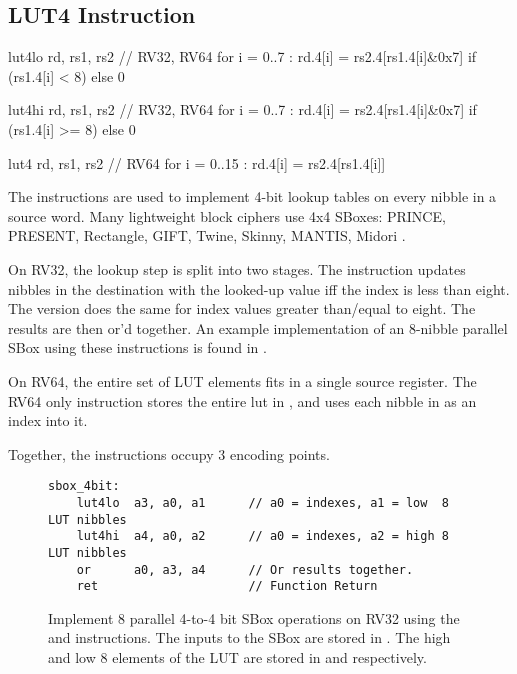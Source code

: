 

\subsection{LUT4 Instruction}

\begin{cryptoisa}
lut4lo  rd, rs1, rs2    // RV32, RV64
    for i = 0..7 : rd.4[i] = rs2.4[rs1.4[i]&0x7] if (rs1.4[i] <  8) else 0

lut4hi  rd, rs1, rs2    // RV32, RV64
    for i = 0..7 : rd.4[i] = rs2.4[rs1.4[i]&0x7] if (rs1.4[i] >= 8) else 0

lut4    rd, rs1, rs2    //       RV64
    for i = 0..15 : rd.4[i] = rs2.4[rs1.4[i]]
\end{cryptoisa}

The  instructions are used to implement 4-bit lookup tables
on every nibble in a source word.
Many lightweight block ciphers use 4x4 SBoxes:
PRINCE\cite{block:prince},
PRESENT\cite{block:present},
Rectangle\cite{block:rectangle},
GIFT\cite{block:gift},
Twine\cite{block:twine},
Skinny, MANTIS\cite{block:skinny},
Midori \cite{block:midori}.

On RV32, the lookup step is split into two stages.
The  instruction
updates nibbles in the destination with the looked-up value
iff the index is less than eight.
The  version does
the same for index values greater than/equal to eight.
The results are then or'd together.
An example implementation of an $8$-nibble parallel SBox using these
instructions is found in .

On RV64, the entire set of LUT elements fits in a single source register.
The RV64 only  instruction stores the entire lut in
\rstwo, and uses each nibble in \rsone as an index into it.

Together, the instructions occupy $3$ encoding points.

\begin{figure}[h]
\begin{lstlisting}[style=ASM]
sbox_4bit:
    lut4lo  a3, a0, a1      // a0 = indexes, a1 = low  8 LUT nibbles
    lut4hi  a4, a0, a2      // a0 = indexes, a2 = high 8 LUT nibbles
    or      a0, a3, a4      // Or results together.
    ret                     // Function Return
\end{lstlisting}
\caption{
    Implement 8 parallel 4-to-4 bit SBox operations on RV32 using
    the  and  instructions.
    The inputs to the SBox are stored in .
    The high and low $8$ elements of the
    LUT are stored in  and  respectively.
}
\label{fig:example:lut4:1}
\end{figure}

